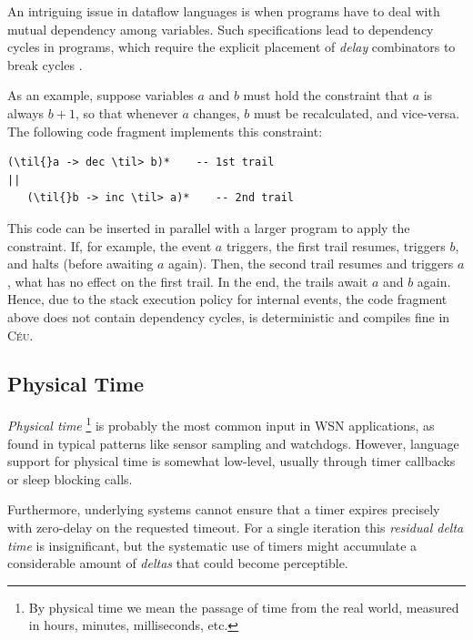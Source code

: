 \documentclass{sig-alternate-ipsn09}
\newcommand{\2}{\;\;}
\newcommand{\5}{\;\;\;\;\;}
\newcommand{\til}{$\thicksim$}
\newcommand{\CEU}{\textsc{C\'{e}u}}
\begin{document}
An intriguing issue in dataflow languages is when programs have to deal with 
mutual dependency among variables.
Such specifications lead to dependency cycles in programs, which require the
explicit placement of \emph{delay} combinators to break cycles
\cite{frp.yampa,frtime.embedding}.

As an example, suppose variables $a$ and $b$ must hold the constraint that $a$ 
is always $b+1$, so that whenever $a$ changes, $b$ must be recalculated, and 
vice-versa.
The following code fragment implements this constraint:

\begin{Verbatim}[commandchars=\\\{\}]
   (\til{}a -> dec \til> b)*    -- 1st trail
||
   (\til{}b -> inc \til> a)*    -- 2nd trail
\end{Verbatim}

This code can be inserted in parallel with a larger program to apply the 
constraint.
If, for example, the event $a$ triggers, the first trail resumes, triggers $b$, 
and halts (before awaiting $a$ again).
Then, the second trail resumes and triggers $a$, what has no effect on the 
first trail.
In the end, the trails await $a$ and $b$ again.
Hence, due to the stack execution policy for internal events, the code fragment 
above does not contain dependency cycles, is deterministic and compiles fine in 
\CEU.




\subsection{Physical Time}
\label{sec:ceu:time}

\emph{Physical time}%
\footnote{
By physical time we mean the passage of time from the real world, measured in 
hours, minutes, milliseconds, etc.
}
is probably the most common input in WSN applications, as found in typical 
patterns like sensor sampling and watchdogs.
However, language support for physical time is somewhat low-level, usually 
through timer callbacks or sleep blocking calls.

Furthermore, underlying systems cannot ensure that a timer expires precisely 
with zero-delay on the requested timeout.
For a single iteration this \emph{residual delta time} is insignificant, but 
the systematic use of timers might accumulate a considerable amount of 
\emph{deltas} that could become perceptible.
\end{document}
